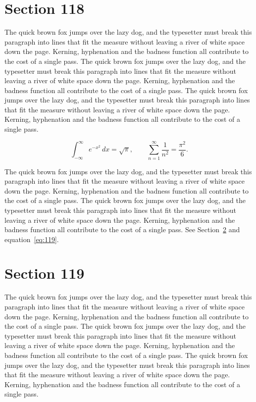 \documentclass{article}
\begin{document}
\section{Section 118}
\label{sec:118}
The quick brown fox jumps over the lazy dog, and the typesetter must break this paragraph into lines that fit the measure without leaving a river of white space down the page. Kerning, hyphenation and the badness function all contribute to the cost of a single pass. The quick brown fox jumps over the lazy dog, and the typesetter must break this paragraph into lines that fit the measure without leaving a river of white space down the page. Kerning, hyphenation and the badness function all contribute to the cost of a single pass. The quick brown fox jumps over the lazy dog, and the typesetter must break this paragraph into lines that fit the measure without leaving a river of white space down the page. Kerning, hyphenation and the badness function all contribute to the cost of a single pass. 

\begin{equation}\label{eq:118}
\int_{-\infty}^{\infty} e^{-x^{2}}\,dx = \sqrt{\pi}, \qquad
\sum_{n=1}^{\infty} \frac{1}{n^{2}} = \frac{\pi^{2}}{6}.
\end{equation}

The quick brown fox jumps over the lazy dog, and the typesetter must break this paragraph into lines that fit the measure without leaving a river of white space down the page. Kerning, hyphenation and the badness function all contribute to the cost of a single pass. The quick brown fox jumps over the lazy dog, and the typesetter must break this paragraph into lines that fit the measure without leaving a river of white space down the page. Kerning, hyphenation and the badness function all contribute to the cost of a single pass. 
See Section~\ref{sec:119} and equation~\eqref{eq:119}.
\section{Section 119}
\label{sec:119}
The quick brown fox jumps over the lazy dog, and the typesetter must break this paragraph into lines that fit the measure without leaving a river of white space down the page. Kerning, hyphenation and the badness function all contribute to the cost of a single pass. The quick brown fox jumps over the lazy dog, and the typesetter must break this paragraph into lines that fit the measure without leaving a river of white space down the page. Kerning, hyphenation and the badness function all contribute to the cost of a single pass. The quick brown fox jumps over the lazy dog, and the typesetter must break this paragraph into lines that fit the measure without leaving a river of white space down the page. Kerning, hyphenation and the badness function all contribute to the cost of a single pass. 
\end{document}
